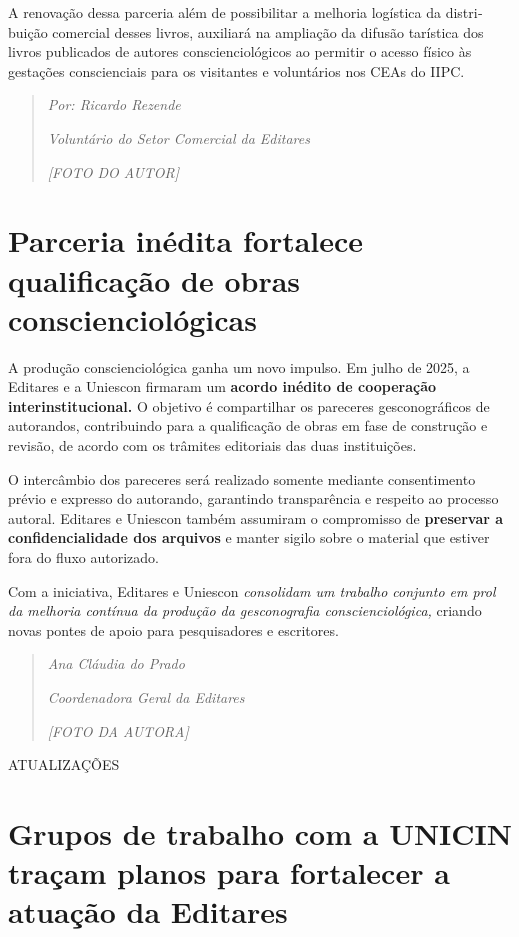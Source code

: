 \documentclass[
]{article}
\begin{document}
A renovação dessa parceria além de possibilitar a melhoria logística da distri­buição comercial desses livros, auxiliará na ampliação da difusão tarística dos livros pu­blicados de autores conscienciológicos ao permitir o acesso físico às gestações conscien­ciais para os visitantes e voluntários nos CEAs do IIPC.

\begin{quote}
\emph{Por: Ricardo Rezende}

\emph{Voluntário do Setor Comercial da Editares}

\emph{{[}FOTO DO AUTOR{]}}
\end{quote}

\section{\texorpdfstring{ Parceria inédita fortalece qualificação de obras conscienciológicas}{ Parceria inédita fortalece qualificação de obras conscienciológicas}}\label{parceria-inuxe9dita-fortalece-qualificauxe7uxe3o-de-obras-consciencioluxf3gicas}

A produção conscienciológica ganha um novo impulso. Em julho de 2025, a Editares e a Uniescon firmaram um \textbf{acordo inédito de cooperação interinstitucional.} O objetivo é compartilhar os pareceres gesconográficos de autorandos, contribuindo para a qualificação de obras em fase de construção e revisão, de acordo com os trâmites editoriais das duas instituições.

O intercâmbio dos pareceres será realizado somente mediante consentimento prévio e expresso do autorando, garantindo transparência e respeito ao processo autoral. Editares e Uniescon também assumiram o compromisso de \textbf{preservar a confidencialidade dos arquivos} e manter sigilo sobre o material que estiver fora do fluxo autorizado.

Com a iniciativa, Editares e Uniescon \emph{consolidam um trabalho conjunto em prol da melhoria contínua da produção da gesconografia conscienciológica,} criando novas pontes de apoio para pesquisadores e escritores.

\begin{quote}
\emph{Ana Cláudia do Prado}

\emph{Coordenadora Geral da Editares}

\emph{{[}FOTO DA AUTORA{]}}
\end{quote}

ATUALIZAÇÕES

\section{Grupos de trabalho com a UNICIN traçam planos para fortalecer a atuação da Editares}\label{grupos-de-trabalho-com-a-unicin-trauxe7am-planos-para-fortalecer-a-atuauxe7uxe3o-da-editares}
\end{document}
